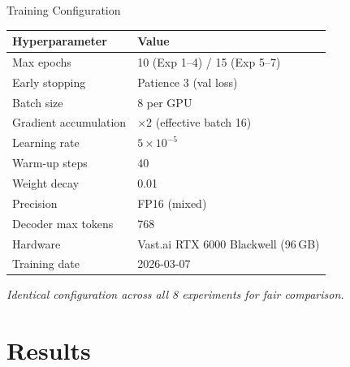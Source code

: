 \documentclass[aspectratio=169,11pt]{beamer}
\begin{document}
\begin{frame}{Training Configuration}
  \centering
  \begin{tabular}{@{}ll@{}}
    \toprule
    \textbf{Hyperparameter} & \textbf{Value} \\
    \midrule
    Max epochs              & 10 (Exp 1--4) / 15 (Exp 5--7) \\
    Early stopping          & Patience 3 (val loss) \\
    Batch size              & 8 per GPU \\
    Gradient accumulation   & $\times$2 (effective batch 16) \\
    Learning rate           & $5 \times 10^{-5}$ \\
    Warm-up steps           & 40 \\
    Weight decay            & 0.01 \\
    Precision               & FP16 (mixed) \\
    Decoder max tokens      & 768 \\
    Hardware                & Vast.ai RTX 6000 Blackwell (96\,GB) \\
    Training date           & 2026-03-07 \\
    \bottomrule
  \end{tabular}

  \vspace{0.4cm}
  \textit{Identical configuration across all 8 experiments for fair comparison.}
\end{frame}

\section{Results}
\end{document}
